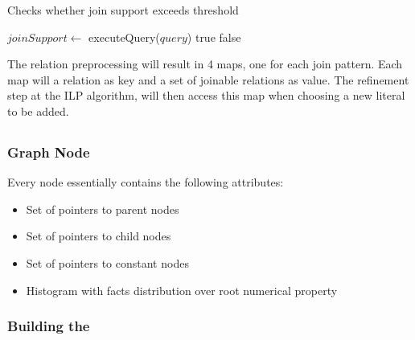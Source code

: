 \begin{algorithm}
  \caption{Checks whether join support exceeds threshold}
     {
    }
    $joinSupport \leftarrow$ executeQuery($query$)\;
      {
      \Return true\;
    }{
      \Return false\;
    }
\end{algorithm}


The relation preprocessing will result in 4 maps, one for each join pattern. Each map will a relation as key and a set of joinable relations as value. The refinement step at the ILP algorithm, will then access this map when choosing a new literal to be added.


\subsection{\graphname}

\subsubsection{Graph Node}

Every node essentially contains the following attributes:

\begin{itemize}
 \item Set of pointers to parent nodes
 \item Set of pointers to child nodes
 \item Set of pointers to constant nodes
 \item Histogram with facts distribution over root numerical property
\end{itemize}


\subsubsection{Building the \graphname}

